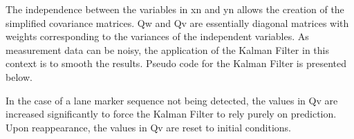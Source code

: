 \documentclass{article}
\begin{document}
The independence between the variables in xn and yn allows the creation of the simplified covariance matrices. Qw and Qv are essentially diagonal matrices with weights corresponding to the variances of the independent variables. As measurement data can be noisy, the application of the Kalman Filter in this context is to smooth the results. Pseudo code for the Kalman Filter is presented below.

In the case of a lane marker sequence not being detected, the values in Qv are increased significantly to force the Kalman Filter to rely purely on prediction. Upon reappearance, the values in Qv are reset to initial conditions.

%
%

%
\end{document}
